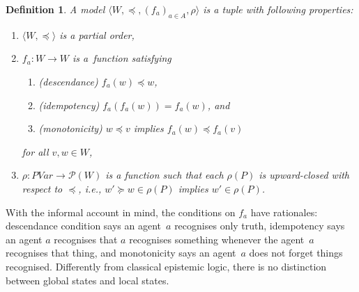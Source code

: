 \documentclass[doctor]{iscs-thesis}
\newcommand{\powerset}[1]{{\mathcal P({#1})}}
\newcommand{\tuple}[1]{\langle{#1}\rangle}
\newtheorem{definition}{Definition}
\begin{document}
\newcommand{\model}[1]{\tuple{W#1, \preceq#1, (f_a#1)_{a\in A}, \rho#1}}
\begin{definition}
\label{model}
 A \textit{model} $\tuple{W,\preceq, (f_a)_{a\in A}, \rho}$ is a tuple with following properties:
\begin{enumerate}
 \item $\tuple{W,\preceq}$ is a partial order,
 \item $f_a\colon W\rightarrow W$ is a~function satisfying
\begin{enumerate}
 \item (descendance) $f_a(w) \preceq w$,
 \item (idempotency) $f_a(f_a(w)) = f_a(w)$, and
 \item (monotonicity) $w\preceq v$ implies $f_a(w)\preceq f_a(v)$
\end{enumerate}
       for all $v,w\in W$,
 \item $\rho\colon PVar\rightarrow \powerset W$ is a function such that each $\rho(P)$ is
       upward-closed with respect to $\preceq$, i.e., $w'\succeq w\in\rho(P)$ implies
       $w'\in\rho(P)$.
\end{enumerate}
\end{definition}
\noindent With the informal account in mind, the conditions on $f_a$ have rationales:
descendance condition says an agent~$a$ recognises only truth, 
idempotency says an agent $a$ recognises that 
       $a$ recognises something whenever the agent~$a$ recognises that thing,
and monotonicity says an agent~$a$ does not forget things recognised.
Differently from classical epistemic logic,
there is no distinction between global states and local states.
\end{document}
